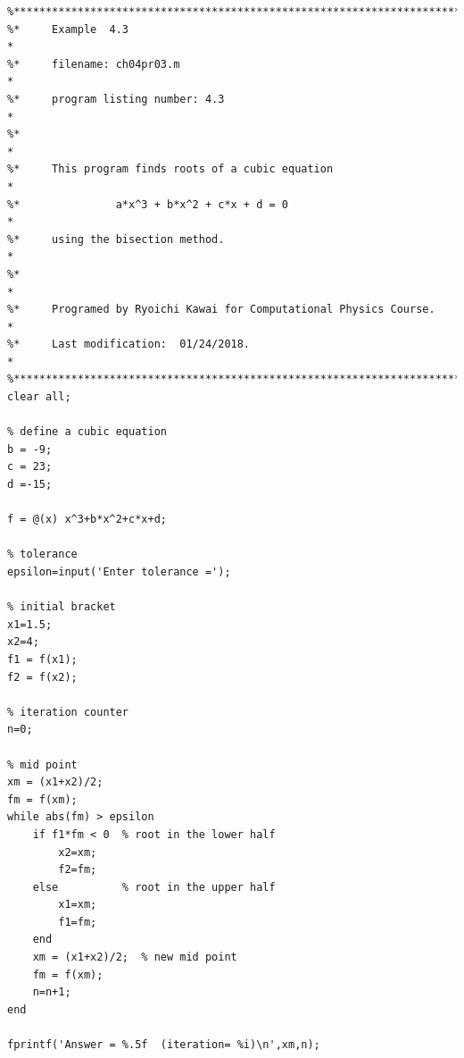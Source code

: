 \program
\bigskip\noindent
\label{prog:bisection}
\footnotesize
\begin{verbatim}
%**************************************************************************
%*     Example  4.3                                                       *
%*     filename: ch04pr03.m                                               *
%*     program listing number: 4.3                                        *
%*                                                                        *
%*     This program finds roots of a cubic equation                       *
%*               a*x^3 + b*x^2 + c*x + d = 0                              *
%*     using the bisection method.                                        *
%*                                                                        *
%*     Programed by Ryoichi Kawai for Computational Physics Course.       *
%*     Last modification:  01/24/2018.                                    *
%**************************************************************************
clear all;

% define a cubic equation
b = -9;
c = 23;
d =-15;

f = @(x) x^3+b*x^2+c*x+d;

% tolerance
epsilon=input('Enter tolerance =');

% initial bracket
x1=1.5;
x2=4;
f1 = f(x1);
f2 = f(x2);

% iteration counter
n=0;

% mid point
xm = (x1+x2)/2;
fm = f(xm);
while abs(fm) > epsilon
    if f1*fm < 0  % root in the lower half
        x2=xm;
        f2=fm;
    else          % root in the upper half
        x1=xm;
        f1=fm;
    end
    xm = (x1+x2)/2;  % new mid point
    fm = f(xm);
    n=n+1;
end

fprintf('Answer = %.5f  (iteration= %i)\n',xm,n);
\end{verbatim}

\normalsize



